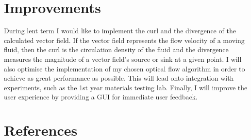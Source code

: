 \documentclass[a4paper,10pt]{article}
\begin{document}
  \section{Improvements}
  
    During lent term I would like to implement the curl and the divergence of the calculated vector field. If the vector field represents the flow velocity of a moving fluid, then the curl is the circulation density of the fluid and the divergence measures the magnitude of a vector field's source or sink at a given point. I will also optimise the implementation of my chosen optical flow algorithm in order to achieve as great performance as possible. This will lead onto integration with experiments, such as the 1st year materials testing lab. Finally, I will improve the user experience by providing a GUI for immediate user feedback.
      
  \section{References}
     
  \printbibliography[heading=none]
 
%  
%  
%  
%  
%  
%  
%  

%    
\end{document}
